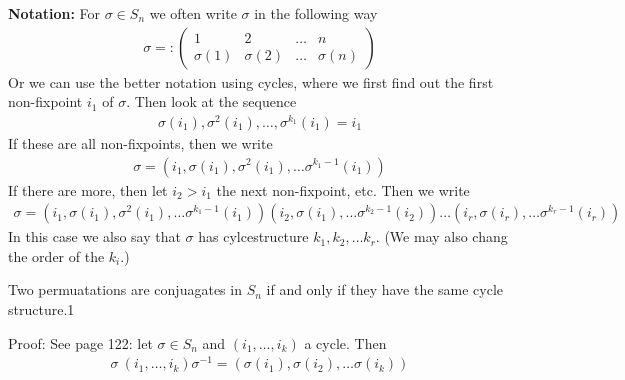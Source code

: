 \textbf{Notation:} \quad For $\sigma \in S_n$ we often write $\sigma$ in the following way
\begin{align*}
	\sigma =: \begin{pmatrix}
	1 & 2 & \ldots & n\\
	\sigma(1) & \sigma(2) & \ldots & \sigma(n)
	\end{pmatrix}
\end{align*}
Or we can use the better notation using cycles, where we first find out the first non-fixpoint $i_1$ of $\sigma$. Then look at the sequence
\begin{align*}
	\sigma(i_1), \sigma^{2}(i_1), \ldots, \sigma^{k_1}(i_1) = i_1
\end{align*}
If these are all non-fixpoints, then we write
\begin{align*}
	\sigma = \left(i_1, \sigma(i_1), \sigma^{2}(i_1), \ldots \sigma^{k_1-1}(i_1)\right)
\end{align*}
If there are more, then let $i_2 > i_1$ the next non-fixpoint, etc. Then we write
\begin{align*}
	\sigma = \left(i_1, \sigma(i_1), \sigma^{2}(i_1), \ldots \sigma^{k_1-1}(i_1)\right) \left(i_2, \sigma(i_1), \ldots \sigma^{k_2 - 1}(i_2)\right) \ldots \left(i_r, \sigma(i_r), \ldots \sigma^{k_r -1}(i_r)\right)
\end{align*}
In this case we also say that $\sigma$ has cylcestructure $k_1, k_2, \ldots k_r$. (We may also chang the order of the $k_i$.)


\begin{proposition}[]
	Two permuatations are conjuagates in $S_n$ if and only if they have the same cycle structure.1
\end{proposition}
Proof: See page 122: let $\sigma \in S_n$ and $(i_1, \ldots, i_k)$ a cycle. Then
\begin{align*}
	\sigma\ (i_1, \ldots, i_k) \sigma^{-1} = \left(\sigma(i_1), \sigma(i_2), \ldots \sigma(i_k)\right)
\end{align*}
